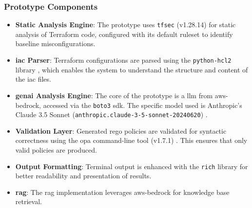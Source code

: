 \subsubsection*{Prototype Components}
\begin{itemize}
	\item \textbf{Static Analysis Engine}: The prototype uses \texttt{tfsec} (v1.28.14) \cite{aqua_security_tfsec_nodate} for static analysis of Terraform code, configured with its default ruleset to identify baseline misconfigurations.
	\item \textbf{\gls{iac} Parser}: Terraform configurations are parsed using the \texttt{python-hcl2} library \cite{amplify_python-hcl2_2025}, which enables the system to understand the structure and content of the \gls{iac} files.
	\item \textbf{\gls{genai} Analysis Engine}: The core of the prototype is a \gls{llm} from \gls{aws-bedrock}, accessed via the \texttt{boto3} \gls{sdk}. The specific model used is Anthropic's Claude 3.5 Sonnet (\texttt{anthropic.claude-3-5-sonnet-20240620}) \cite{anthropic_claude_2023}.
	\item \textbf{Validation Layer}: Generated \gls{rego} policies are validated for syntactic correctness using the \gls{opa} command-line tool (v1.7.1) \cite{the_opa_authors_open_nodate}. This ensures that only valid policies are produced.
	\item \textbf{Output Formatting}: Terminal output is enhanced with the \texttt{rich} library \cite{textualize_rich_nodate} for better readability and presentation of results.
	\item \textbf{\gls{rag}}: The \gls{rag} implementation leverages \gls{aws-bedrock} for knowledge base retrieval.
\end{itemize}

